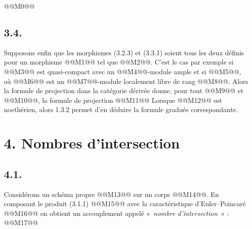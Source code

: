 
@@M0@@

\subsection*{3.4.}
Supposons enfin que les morphismes (3.2.3) et (3.3.1) soient tous les deux définis pour un morphisme @@M1@@ tel que @@M2@@. C'est le cas par exemple si @@M3@@ est quasi-compact avec un @@M4@@-module ample et si @@M5@@, où @@M6@@ est un @@M7@@-module localement libre de rang @@M8@@. Alors la formule de projection dans la catégorie dérivée donne, pour tout @@M9@@ et @@M10@@, la formule de projection
@@M11@@
Lorsque @@M12@@ est noethérien, alors 1.3.2 permet d'en déduire la formule graduée correspondante.

\section*{4. Nombres d'intersection}

\subsection*{4.1.}
Considérons un schéma propre @@M13@@ sur un corps @@M14@@. En composant le produit (3.1.1)
@@M15@@
avec la caractéristique d'Euler--Poincaré
@@M16@@
on obtient un accouplement appelé «~\emph{nombre d'intersection}~» :
@@M17@@

